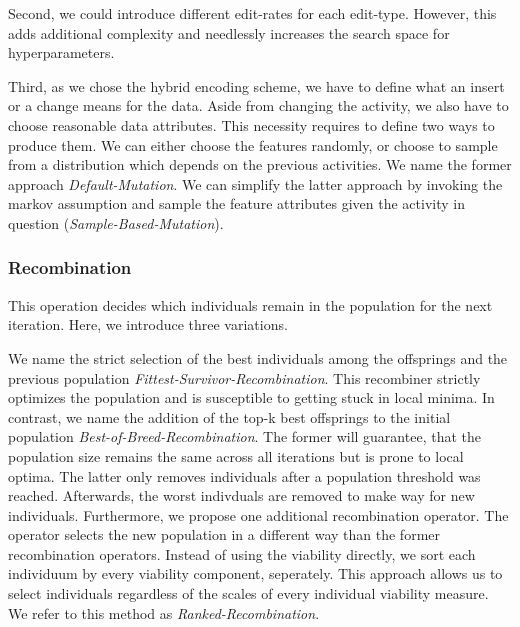 \documentclass[./../../paper.tex]{subfiles}
\begin{document}
Second, we could introduce different edit-rates for each edit-type. However, this adds additional complexity and needlessly increases the search space for hyperparameters.

Third, as we chose the hybrid encoding scheme, we have to define what an insert or a change means for the data. Aside from changing the activity, we also have to choose reasonable data attributes. This necessity requires to define two ways to produce them. We can either choose the features randomly, or choose to sample from a distribution which depends on the previous activities. We name the former approach \emph{Default-Mutation}. We can simplify the latter approach by invoking the markov assumption and sample the feature attributes given the activity in question (\emph{Sample-Based-Mutation}).

\subsubsection{Recombination}
This operation decides which individuals remain in the population for the next iteration\footnotemark[1]. Here, we introduce three variations.

We name the strict selection of the best individuals among the offsprings and the previous population \emph{Fittest-Survivor-Recombination}. This recombiner strictly optimizes the population and is susceptible to getting stuck in local minima. In contrast, we name the addition of the top-k best offsprings to the initial population \emph{Best-of-Breed-Recombination}. The former will guarantee, that the population size remains the same across all iterations but is prone to local optima. The latter only removes individuals after a population threshold was reached. Afterwards, the worst indivduals are removed to make way for new individuals. Furthermore, we propose one additional recombination operator. The operator selects the new population in a different way than the former recombination operators. Instead of using the viability directly, we sort each individuum by every viability component, seperately. This approach allows us to select individuals regardless of the scales of every individual viability measure. We refer to this method as \emph{Ranked-Recombination}. 

\end{document}
